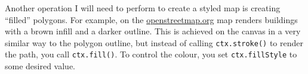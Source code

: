 Another operation I will need to perform to create a styled map is creating ``filled'' polygons. For example, on the \href{https://openstreetmap.org}{openstreetmap.org} map renders buildings with a brown infill and a darker outline. This is achieved on the canvas in a very similar way to the polygon outline, but instead of calling \texttt{ctx.stroke()} to render the path, you call \texttt{ctx.fill()}. To control the colour, you set \texttt{ctx.fillStyle} to some desired value.


\printbibliography{}


